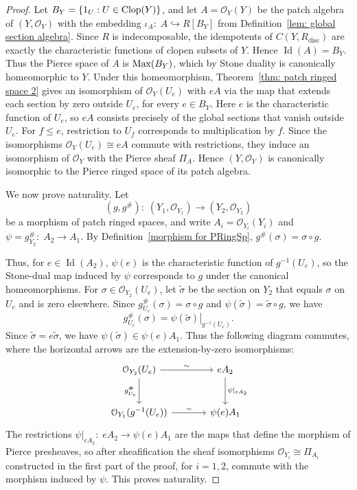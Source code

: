\documentclass[11pt]{amsart}
\def\O{{\mathcal{O}}}
\begin{document}
\begin{proof} Let $B_Y=\{1_U:U\in\mbox{\rm Clop}(Y)\}$, and let $A=\O_Y(Y)$ be the patch algebra of $(Y,\O_Y)$ 
with the embedding $\iota_A\colon\; A\hookrightarrow R[B_Y]$ from  Definition~\ref{lem: global section algebra}.
Since $R$ is indecomposable, the idempotents of
$C(Y,R_{\mathrm{disc}})$ are exactly the characteristic functions of clopen subsets of $Y$. Hence $\operatorname{Id}(A)=B_Y.$ Thus the Pierce space of $A$ is $\mbox{\rm Max}(B_Y)$, which by Stone duality is canonically
homeomorphic to $Y$.
Under this homeomorphism, Theorem~\ref{thm: patch ringed space 2} gives an isomorphism of $\O_Y(U_e)$ with $eA$ via the map that extends each section by zero outside $U_e$, for every $e\in B_Y$.
Here $e$ is the characteristic function of $U_e$, so $eA$ consists precisely of the global sections that vanish outside $U_e$. 
For $f\le e$, restriction to $U_f$ corresponds to multiplication by $f$.
Since the isomorphisms $\mathcal O_Y(U_e)\cong eA$ commute with restrictions, they induce an isomorphism of  $\mathcal O_Y$ with the Pierce sheaf $\Pi_A$. Hence $(Y,\O_Y)$ is canonically isomorphic to the Pierce ringed space of its patch algebra.

We now prove naturality. Let
$$
(g,g^\#)\colon\; (Y_1,\mathcal O_{Y_1})\longrightarrow (Y_2,\mathcal O_{Y_2})
$$
be a morphism of patch ringed spaces, and write $A_i=\mathcal O_{Y_i}(Y_i)$ and $\psi=g^\#_{Y_2}\colon\; A_2\to A_1$. By Definition~\ref{morphism for PRingSp}, $g^\#(\sigma)
 =\sigma\circ g$.

 Thus, for $e\in\operatorname{Id}(A_2)$, $\psi(e)$ is the characteristic function of $g^{-1}(U_e)$, so the Stone-dual map induced by $\psi$ corresponds to $g$ under the canonical homeomorphisms.
For $\sigma\in\mathcal O_{Y_2}(U_e)$, let $\widetilde{\sigma}$ be the section on $Y_2$ that equals $\sigma$ on $U_e$ and is zero elsewhere. Since $g^\#_{U_e}(\sigma)=\sigma\circ g$ and $\psi(\widetilde{\sigma})=\widetilde{\sigma}\circ g$, we have
$$ g^\#_{U_e}(\sigma) =\left.\psi(\widetilde{\sigma})\right|_{g^{-1}(U_e)}.$$
Since $\widetilde{\sigma}=e\widetilde{\sigma}$, we have $\psi(\widetilde{\sigma})\in\psi(e)A_1$. Thus the following diagram commutes, where the horizontal arrows are the extension-by-zero isomorphisms:
$$
\begin{tikzcd}[column sep=large, row sep=large]
\mathcal O_{Y_2}(U_e)
  \arrow[r, "\sim"] \arrow[d, "g^\#_{U_e}"']
& eA_2 \arrow[d, "{\psi|_{eA_2}}"] \\
\mathcal O_{Y_1}(g^{-1}(U_e))
  \arrow[r, "\sim"]
& \psi(e)A_1
\end{tikzcd}
$$
The restrictions $\psi|_{eA_2}\colon\; eA_2\to\psi(e)A_1$ are the maps that define the morphism of Pierce presheaves, so after sheafification 
the sheaf isomorphisms $\mathcal O_{Y_i}\cong\Pi_{A_i}$ constructed in the first part of the proof, for $i=1,2$, commute with the morphism induced by $\psi$. This proves naturality.
\end{proof}
\end{document}
